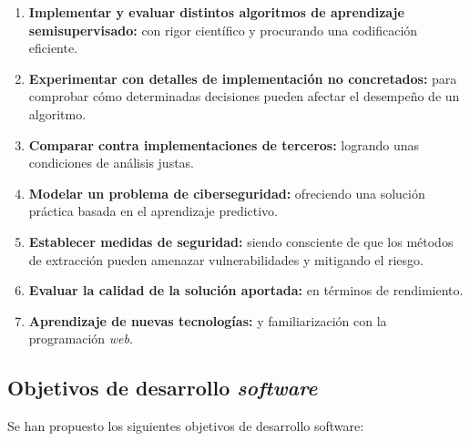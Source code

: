 \begin{enumerate}
	\item \textbf{Implementar y evaluar distintos algoritmos de aprendizaje semisupervisado:} con rigor científico y procurando una codificación eficiente.
	\item \textbf{Experimentar con detalles de implementación no concretados:} para comprobar cómo determinadas decisiones pueden afectar el desempeño de un algoritmo.
	\item \textbf{Comparar contra implementaciones de terceros:} logrando unas condiciones de análisis justas.
	\item \textbf{Modelar un problema de ciberseguridad:} ofreciendo una solución práctica basada en el aprendizaje predictivo.
	\item \textbf{Establecer medidas de seguridad:} siendo consciente de que los métodos de extracción pueden amenazar vulnerabilidades y mitigando el riesgo.
	\item \textbf{Evaluar la calidad de la solución aportada:} en términos de rendimiento.
	\item \textbf{Aprendizaje de nuevas tecnologías:} y familiarización con la programación \textit{web}.
	
\end{enumerate}

\subsection{Objetivos de desarrollo \textit{software}}
\label{Objetivos de desarrollo}

Se han propuesto los siguientes objetivos de desarrollo software:

